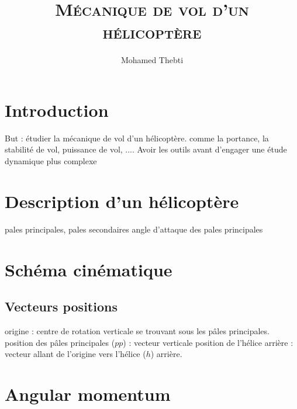 \documentclass[12pt,a4paper]{article}
\title{
	\Huge\textsc{Mécanique de vol d'un hélicoptère}
}
\author{Mohamed Thebti}
\begin{document}
\setlength{\parindent}{0mm}

\fancyhead[R]{\slshape \leftmark}

\fancyfoot[C]{}
\fancyfoot[R]{\thepage}

\maketitle
\newpage

\tableofcontents

\newpage


\section{Introduction}

But : étudier la mécanique de vol d'un hélicoptère. comme la portance, la stabilité de vol, puissance de vol, ....
\medbreak
Avoir les outils avant d'engager une étude dynamique plus complexe 

\newpage
\section{Description d'un hélicoptère}
pales principales, pales secondaires
angle d'attaque des pales principales

\newpage
\section{Schéma cinématique}


\subsection{Vecteurs positions}
origine : centre de rotation verticale se trouvant sous les pâles principales.
\medbreak
position  des pâles principales ($pp$) : vecteur verticale
\medbreak
position de l'hélice arrière : 
vecteur allant de l'origine vers l'hélice ($h$) arrière. 


\newpage
\section{Angular momentum}
\end{document}
